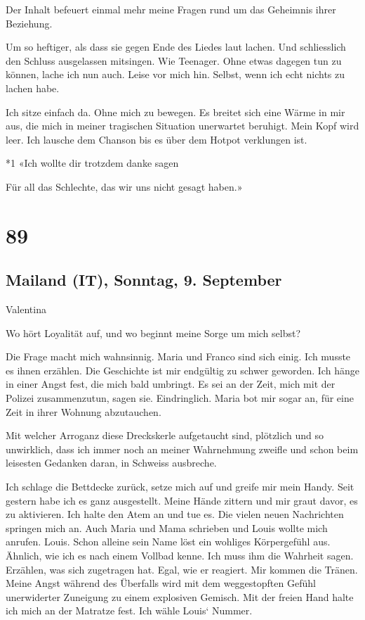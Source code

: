 Der Inhalt befeuert einmal mehr meine Fragen rund um das Geheimnis ihrer
Beziehung.

Um so heftiger, als dass sie gegen Ende des Liedes laut lachen. Und
schliesslich den Schluss ausgelassen mitsingen. Wie Teenager. Ohne etwas
dagegen tun zu können, lache ich nun auch. Leise vor mich hin. Selbst,
wenn ich echt nichts zu lachen habe.

Ich sitze einfach da. Ohne mich zu bewegen. Es breitet sich eine Wärme
in mir aus, die mich in meiner tragischen Situation unerwartet beruhigt.
Mein Kopf wird leer. Ich lausche dem Chanson bis es über dem Hotpot
verklungen ist.

*1 «Ich wollte dir trotzdem danke sagen

Für all das Schlechte, das wir uns nicht gesagt haben.»

\chapter{89}\label{section-89}

\section{\texorpdfstring{Mailand (IT), Sonntag, 9. September
}{Mailand (IT), Sonntag, 9. September }}\label{mailand-it-sonntag-9.-september}

Valentina

Wo hört Loyalität auf, und wo beginnt meine Sorge um mich selbst?

Die Frage macht mich wahnsinnig. Maria und Franco sind sich einig. Ich
musste es ihnen erzählen. Die Geschichte ist mir endgültig zu schwer
geworden. Ich hänge in einer Angst fest, die mich bald umbringt. Es sei
an der Zeit, mich mit der Polizei zusammenzutun, sagen sie.
Eindringlich. Maria bot mir sogar an, für eine Zeit in ihrer Wohnung
abzutauchen.

Mit welcher Arroganz diese Dreckskerle aufgetaucht sind, plötzlich und
so unwirklich, dass ich immer noch an meiner Wahrnehmung zweifle und
schon beim leisesten Gedanken daran, in Schweiss ausbreche.

Ich schlage die Bettdecke zurück, setze mich auf und greife mir mein
Handy. Seit gestern habe ich es ganz ausgestellt. Meine Hände zittern
und mir graut davor, es zu aktivieren. Ich halte den Atem an und tue es.
Die vielen neuen Nachrichten springen mich an. Auch Maria und Mama
schrieben und Louis wollte mich anrufen. Louis. Schon alleine sein Name
löst ein wohliges Körpergefühl aus. Ähnlich, wie ich es nach einem
Vollbad kenne. Ich muss ihm die Wahrheit sagen. Erzählen, was sich
zugetragen hat. Egal, wie er reagiert. Mir kommen die Tränen. Meine
Angst während des Überfalls wird mit dem weggestopften Gefühl
unerwiderter Zuneigung zu einem explosiven Gemisch. Mit der freien Hand
halte ich mich an der Matratze fest. Ich wähle Louis` Nummer.

